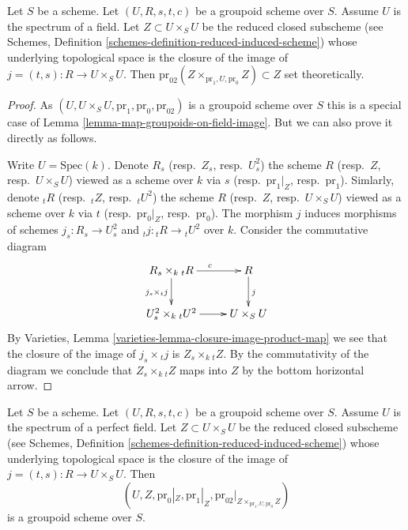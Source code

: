 \begin{lemma}
\label{lemma-groupoid-on-field-image}
Let $S$ be a scheme. Let $(U, R, s, t, c)$ be a groupoid scheme
over $S$. Assume $U$ is the spectrum of a field.
Let $Z \subset U \times_S U$ be the reduced closed subscheme (see
Schemes, Definition \ref{schemes-definition-reduced-induced-scheme})
whose underlying topological space is the closure of the image of
$j = (t, s) : R \to U \times_S U$. Then
$\text{pr}_{02}(Z \times_{\text{pr}_1, U, \text{pr}_0} Z) \subset Z$
set theoretically.
\end{lemma}

\begin{proof}
As $(U, U \times_S U, \text{pr}_1, \text{pr}_0, \text{pr}_{02})$
is a groupoid scheme over $S$ this is a special case of
Lemma \ref{lemma-map-groupoids-on-field-image}.
But we can also prove it directly as follows.

\medskip\noindent
Write $U = \text{Spec}(k)$. Denote
$R_s$ (resp.\ $Z_s$, resp.\ $U^2_s$) the scheme
$R$ (resp.\ $Z$, resp.\ $U \times_S U$) viewed as a scheme over $k$ via
$s$ (resp.\ $\text{pr}_1|_Z$, resp.\ $\text{pr}_1$).
Simlarly, denote
${}_tR$ (resp.\ ${}_tZ$, resp.\ ${}_tU^2$) the scheme
$R$ (resp.\ $Z$, resp.\ $U \times_S U$) viewed as a scheme over $k$ via
$t$ (resp.\ $\text{pr}_0|_Z$, resp.\ $\text{pr}_0$).
The morphism $j$ induces morphisms of schemes
$j_s : R_s \to U^2_s$ and ${}_tj : {}_tR \to {}_tU^2$ over $k$.
Consider the commutative diagram
$$
\xymatrix{
R_s \times_k {}_tR \ar[r]^c \ar[d]_{j_s \times {}_tj} &  R \ar[d]^j \\
U^2_s \times_k {}_tU^2 \ar[r] & U \times_S U
}
$$
By
Varieties, Lemma \ref{varieties-lemma-closure-image-product-map}
we see that the closure of the image of $j_s \times {}_tj$ is
$Z_s \times_k {}_tZ$. By the commutativity of the diagram we
conclude that $Z_s \times_k {}_tZ$ maps into $Z$ by the bottom
horizontal arrow.
\end{proof}

\begin{lemma}
\label{lemma-groupoid-on-perfect-field-image}
Let $S$ be a scheme. Let $(U, R, s, t, c)$ be a groupoid scheme
over $S$. Assume $U$ is the spectrum of a perfect field.
Let $Z \subset U \times_S U$ be the reduced closed subscheme (see
Schemes, Definition \ref{schemes-definition-reduced-induced-scheme})
whose underlying topological space is the closure of the image of
$j = (t, s) : R \to U \times_S U$.
Then
$$
(U, Z, \text{pr}_0|_Z, \text{pr}_1|_Z,
\text{pr}_{02}|_{Z \times_{\text{pr}_1, U, \text{pr}_0} Z})
$$
is a groupoid scheme over $S$.
\end{lemma}

